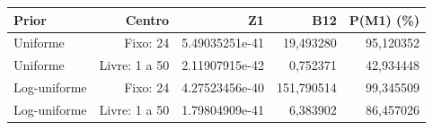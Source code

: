 \begin{tabular}{lrrrr}
\toprule
Prior & Centro & Z1 & B12 & P(M1) (\%) \\
\midrule
Uniforme & Fixo: 24 & 5.49035251e-41 & 19,493280 & 95,120352 \\
Uniforme & Livre: 1 a 50 & 2.11907915e-42 & 0,752371 & 42,934448 \\
Log-uniforme & Fixo: 24 & 4.27523456e-40 & 151,790514 & 99,345509 \\
Log-uniforme & Livre: 1 a 50 & 1.79804909e-41 & 6,383902 & 86,457026 \\
\bottomrule
\end{tabular}
